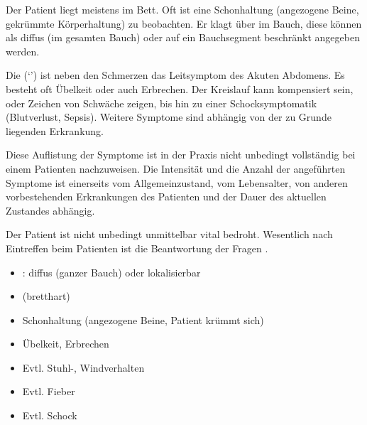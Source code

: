 \TextSlide{\TxSymptome}
{%
Der Patient liegt meistens im Bett. Oft ist eine
Schonhaltung (angezogene Beine, gekrümmte Körperhaltung) zu
beobachten. Er klagt über  im Bauch, diese können
als diffus (im gesamten Bauch) oder auf ein Bauchsegment
beschränkt angegeben werden.

Die  (\enquote*{}) ist
neben den Schmerzen das Leitsymptom des Akuten Abdomens.
Es besteht oft Übelkeit oder auch Erbrechen. Der Kreislauf
kann kompensiert sein, oder Zeichen von Schwäche zeigen, bis
hin zu einer Schocksymptomatik (Blutverlust, Sepsis).
Weitere Symptome sind abhängig von der zu Grunde liegenden
Erkrankung.

Diese Auflistung der Symptome ist in der Praxis nicht
unbedingt vollständig bei einem Patienten nachzuweisen. Die
Intensität und die Anzahl der angeführten Symptome ist
einerseits vom Allgemeinzustand, vom Lebensalter, von
anderen vorbestehenden Erkrankungen des Patienten und der
Dauer des aktuellen Zustandes abhängig.

Der Patient ist nicht unbedingt unmittelbar vital
bedroht. Wesentlich nach Eintreffen beim Patienten ist die
Beantwortung der Fragen .

} 
{
\begin{itemize}
  \item {}: diffus (ganzer Bauch) oder
  lokalisierbar
  \item {} (bretthart)
  \item Schonhaltung  (angezogene Beine, Patient
  krümmt sich)
  \item Übelkeit, Erbrechen
  \item Evtl. Stuhl-, Windverhalten
  \item Evtl. Fieber
  \item Evtl. Schock
\end{itemize}
}{}{}{}




